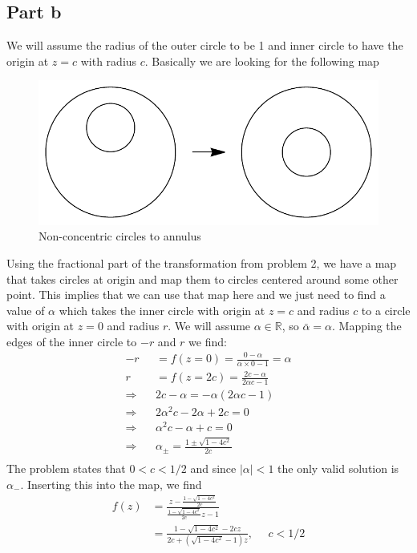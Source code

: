 \documentclass[a4paper,12pt]{article}
\begin{document}
\subsection*{Part b}
We will assume the radius of the outer circle to be 1 and inner circle to have the origin at $z=c$ with radius $c$. Basically we are looking for the following map
\begin{figure}[H]
	\centering
	\includegraphics[width=0.7\linewidth]{map.pdf}
	\caption{Non-concentric circles to annulus}
	\label{fig:4}
\end{figure}
Using the fractional part of the transformation from problem 2, we have a map that takes circles at origin and map them to circles centered around some other point. This implies that we can use that map here and we just need to find a value of $\alpha$ which takes the inner circle with origin at $z=c$ and radius $c$ to a circle with origin at $z=0$ and radius $r$. We will assume $\alpha\in \mathds R$, so $\bar \alpha=\alpha$. Mapping the edges of the inner circle to $-r$ and $r$ we find:
\begin{equation}
\begin{aligned}
-r&=f(z=0)=\frac{0-\alpha}{\alpha\times 0-1}=\alpha
\\
r&=f(z=2c)=\frac{2c-\alpha}{2\alpha c-1}\\
\Rightarrow~~~~&2c-\alpha=-\alpha(2\alpha c-1)\\
\Rightarrow~~~~&2\alpha^2c-2\alpha+2c=0\\
\Rightarrow~~~~&\alpha^2c-\alpha+c=0\\
\Rightarrow~~~~&\alpha_\pm =\frac{1\pm\sqrt{1-4c^2}}{2c}\\
\end{aligned}
\end{equation}
The problem states that $0<c<1/2$ and since $|\alpha|<1$ the only valid solution is $\alpha_-$. Inserting this into the map, we find
\begin{equation}
\begin{aligned}
	f(z)&= \frac{z-\frac{1-\sqrt{1-4c^2}}{2c}}{\frac{1-\sqrt{1-4c^2}}{2c} z-1}\\
	&=\frac{1-\sqrt{1-4c^2}-2cz}{2c+(\sqrt{1-4c^2}-1)z},~~~~~~c<1/2
\end{aligned}
\end{equation}
\end{document}
